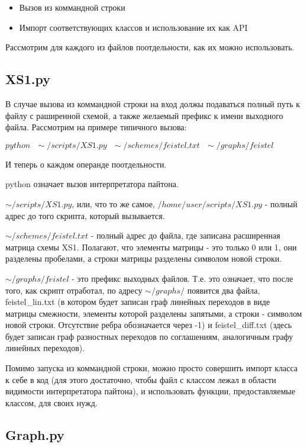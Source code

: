 \documentclass[a4paper,12pt]{extarticle}
\theoremstyle{plain} %
\begin{document}
\begin{large}
\begin{itemize}
\item Вызов из коммандной строки
\item Импорт соответствующих классов и использование их как API
\end{itemize}

Рассмотрим для каждого из файлов поотдельности, как их можно использовать.

\subsection{XS1.py}

В случае вызова из коммандной строки на вход должы подаваться полный путь к файлу с раширенной схемой, а также желаемый префикс к имени выходного файла. Рассмотрим на примере типичного вызова:

$python ~~~\sim/scripts/XS1.py~~~ \sim/schemes/feistel.txt~~~ \sim/graphs/feistel$

И теперь о каждом операнде поотдельности.

python означает вызов интерпретатора пайтона.

$\sim/scripts/XS1.py$, или, что то же самое, $/home/user/scripts/XS1.py$ - полный адрес до того скрипта, который вызывается.

$\sim/schemes/feistel.txt$ - полный адрес до файла, где записана расширенная матрица схемы XS1. Полагают, что элементы матрицы - это только 0 или 1, они разделены пробелами, а строки матрицы разделены символом новой строки.

$\sim/graphs/feistel$ - это префикс выходных файлов. Т.е. это означает, что после того, как скрипт отработал, по адресу $\sim/graphs/$ появится два файла, feistel\_lin.txt (в котором будет записан граф линейных переходов в виде матрицы смежности, элементы которой разделены запятыми, а строки - символом новой строки. Отсутствие ребра обозначается через -1) и feistel\_diff.txt (здесь будет записан  граф разностных переходов по соглашениям, аналогичным графу линейных переходов).

Помимо запуска из коммандной строки, можно просто совершить импорт класса к себе в код (для этого достаточно, чтобы файл с классом лежал в области видимости интерпретатора пайтона), и использовать функции, предоставляемые классом, для своих нужд.

\subsection{Graph.py}


\end{large}
\end{document}

